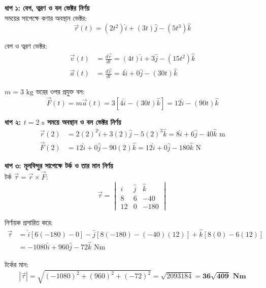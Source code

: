 \documentclass[12pt, a4paper]{article}
\begin{document}
\begin{tcolorbox}[solutionbox={সমাধান (Solution)}]
\noindent
\textbf{ধাপ ১: বেগ, ত্বরণ ও বল ভেক্টর নির্ণয়} \\
সময়ের সাপেক্ষে কণার অবস্থান ভেক্টর:
\[\vec{r}(t) = (2t^2)\hat{i} + (3t)\hat{j} - (5t^3)\hat{k}\]

বেগ ও ত্বরণ ভেক্টর:
\begin{align*}
    \vec{v}(t) &= \frac{d\vec{r}}{dt} = (4t)\hat{i} + 3\hat{j} - (15t^2)\hat{k} \\
    \vec{a}(t) &= \frac{d\vec{v}}{dt} = 4\hat{i} + 0\hat{j} - (30t)\hat{k}
\end{align*}

$m = 3\text{ kg}$ ভরের ওপর প্রযুক্ত বল:
\[\vec{F}(t) = m\vec{a}(t) = 3[4\hat{i} - (30t)\hat{k}] = 12\hat{i} - (90t)\hat{k}\]

\vspace{0.5em}
\noindent\textbf{ধাপ ২: $t = 2\text{ s}$ সময়ে অবস্থান ও বল ভেক্টর নির্ণয়} \\
\begin{align*}
    \vec{r}(2) &= 2(2)^2\hat{i} + 3(2)\hat{j} - 5(2)^3\hat{k} = 8\hat{i} + 6\hat{j} - 40\hat{k}\text{ m} \\
    \vec{F}(2) &= 12\hat{i} + 0\hat{j} - 90(2)\hat{k} = 12\hat{i} + 0\hat{j} - 180\hat{k}\text{ N}
\end{align*}

\vspace{0.5em}
\noindent\textbf{ধাপ ৩: মূলবিন্দুর সাপেক্ষে টর্ক ও তার মান নির্ণয়} \\
টর্ক $\vec{\tau} = \vec{r} \times \vec{F}$:
\[\vec{\tau} = \begin{vmatrix} \hat{i} & \hat{j} & \hat{k} \\ 8 & 6 & -40 \\ 12 & 0 & -180 \end{vmatrix}\]

নির্ণায়ক প্রসারিত করে:
\begin{align*}
    \vec{\tau} &= \hat{i}[6(-180) - 0] - \hat{j}[8(-180) - (-40)(12)] + \hat{k}[8(0) - 6(12)] \\
    &= -1080\hat{i} + 960\hat{j} - 72\hat{k}\text{ Nm}
\end{align*}

টর্কের মান:
\[|\vec{\tau}| = \sqrt{(-1080)^2 + (960)^2 + (-72)^2} = \sqrt{2093184} = \mathbf{36\sqrt{409}\text{ Nm}}\]
\end{tcolorbox}
\end{document}
